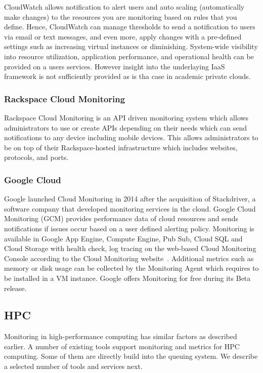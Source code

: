 \documentclass{sig-alternate-05-2015}
\begin{document}
CloudWatch allows notification to alert users and auto scaling (automatically make changes) to the resources you are monitoring based on rules that you define. Hence, CloudWatch can manage thresholds to send a notification to users via email or text messages, and even more, apply changes with a pre-defined settings such as increasing virtual instances or diminishing. System-wide visibility into resource utilization, application performance, and operational health can be provided on a users services. However insight into the underlaying IaaS framework is not sufficiently provided as is tha case in academic private clouds.

\subsubsection{Rackspace Cloud Monitoring}

Rackspace Cloud Monitoring is an API driven monitoring system which allows administrators to use or create APIs depending on their needs which can send notifications to any device including mobile devices. This allows administrators to be on top of their Rackspace-hosted infrastructure which includes websites, protocols, and ports.

\subsubsection{Google Cloud}

Google launched Cloud Monitoring in 2014 after the acquisition of Stackdriver, a software company that developed monitoring services in the cloud. Google Cloud Monitoring (GCM) provides performance data of cloud resources and sends notifications if issues occur based on a user defined alerting policy.  Monitoring is available in Google App Engine, Compute Engine, Pub Sub, Cloud SQL and Cloud Storage with health check, log tracing on the web-based Cloud Monitoring Console according to the Cloud Monitoring website~\cite{GCM}.  Additional metrics such as memory or disk usage can be collected by the Monitoring Agent which requires to be installed in a VM instance. Google offers Monitoring for free during its Beta release.

\subsection{HPC}

Monitoring in high-performance computing has similar factors as described earlier. A number of existing tools support monitoring and metrics for HPC computing. Some of them are directly build into the queuing system. We describe a selected number of tools and services next.
\end{document}
